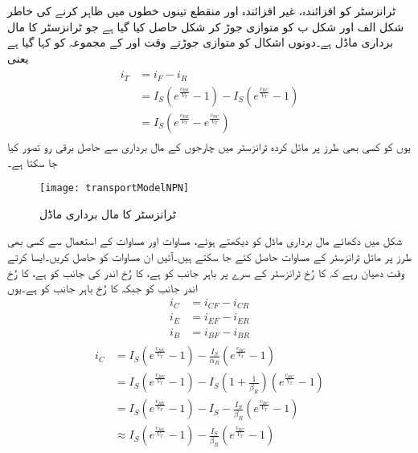  ٹرانزسٹر کو افزائندہ، غیر افزائندہ اور منقطع تینوں خطوں میں ظاہر کرنے کی خاطر شکل  الف اور شکل  ب  کو متوازی جوڑ کر شکل   حاصل کیا گیا ہے جو  ٹرانزسٹر کا مال برداری ماڈل ہے۔دونوں اشکال کو متوازی جوڑتے وقت   اور   کے مجموعہ کو  کہا گیا ہے یعنی
\begin{gather}
\begin{aligned}
i_T &=i_F-i_R\\
&=I_S \left (e^{\frac{v_{BE}}{V_T}}-1 \right ) -I_S \left (e^{\frac{v_{BC}}{V_T}}-1 \right )\\
&=I_S \left (e^{\frac{v_{BE}}{V_T}}-e^{\frac{v_{
BC}}{V_T}} \right )
\end{aligned}
\end{gather}
یوں  کو کسی بھی طرز پر مائل کردہ ٹرانزسٹر میں چارجوں کے مال برداری سے حاصل برقی رو تصور کیا جا سکتا ہے۔
\begin{figure}
\centering
\texttt{[image: transportModelNPN]}
\caption{ ٹرانزسٹر کا مال برداری ماڈل}
\label{شکل_مال_برداری_ماڈل}
\end{figure}
شکل   میں دکھائے مال برداری ماڈل کو دیکھتے ہوئے، مساوات  اور مساوات  کے استعمال سے کسی بھی طرز پر مائل ٹرانزسٹر کے مساوات حاصل کئے جا سکتے ہیں۔آئیں ان مساوات کو حاصل کریں۔ایسا کرتے وقت دھیان رہے کہ  کا رُخ ٹرانزسٹر کے سرے پر باہر جانب کو ہے،   کا رُخ اندر کی جانب کو ہے،   کا رُخ اندر جانب کو  جبکہ   کا رُخ باہر جانب کو ہے۔یوں
\begin{align}
i_C&=i_{CF}-i_{CR}\\
i_E&=i_{EF}-i_{ER}\\
i_B&=i_{BF}-i_{BR}
\end{align}
%
\begin{gather} \label{مساوات_ٹرانزسٹر_چارجوں_کی_مال_برداری_اور_کلکٹر _رو}
\begin{aligned}
i_C&=I_S \left (e^{\frac{v_{BE}}{V_T}}-1 \right )-\frac{I_S}{\alpha_R} \left(e^{\frac{v_{BC}}{V_T}}-1 \right )\\
&=I_S \left (e^{\frac{v_{BE}}{V_T}}-1 \right ) -I_S \left (1+\frac{1}{\beta_R} \right ) \left (e^{\frac{v_{BC}}{V_T}}-1 \right )\\
&=I_S \left (e^{\frac{v_{BE}}{V_T}}-1 \right ) - I_S -\frac{I_S}{\beta_R} \left (e^{\frac{v_{BC}}{V_T}}-1 \right ) \\
&\approx  I_S \left (e^{\frac{v_{BE}}{V_T}}-1 \right )  -\frac{I_S}{\beta_R} \left (e^{\frac{v_{BC}}{V_T}}-1 \right )
\end{aligned}
\end{gather}
